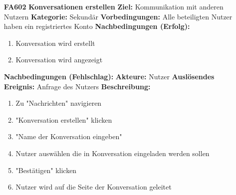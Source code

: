 \documentclass[parskip=full]{scrartcl}
\begin{document}
\begin{itemize}[nosep]
				
			\item[\textbf{FA602}]\textbf{ Konversationen erstellen} \label{sec:FA602}
			\newline \textbf{Ziel:} Kommunikation mit anderen Nutzern
			\newline \textbf{Kategorie:} Sekundär
			\newline \textbf{Vorbedingungen:} Alle beteiligten Nutzer haben ein registriertes Konto 
			\newline \textbf{Nachbedingungen (Erfolg):} 
			\begin{enumerate}[nosep]
				\item Konversation wird erstellt
				\item Konversation wird angezeigt 
			\end{enumerate}
			\textbf{Nachbedingungen (Fehlschlag):}
			\newline \textbf{Akteure:} Nutzer
			\newline \textbf{Auslösendes Ereignis:} Anfrage des Nutzers
			\newline \textbf{Beschreibung:}
			\begin{enumerate}[nosep]
				\item Zu "Nachrichten" navigieren
				\item "Konversation erstellen" klicken
				\item "Name der Konversation eingeben"
				\item Nutzer auswählen die in Konversation eingeladen werden sollen
				\item "Bestätigen" klicken
				\item Nutzer wird auf die Seite der Konversation geleitet\\
			\end{enumerate}
			

\end{itemize}
\end{document}
